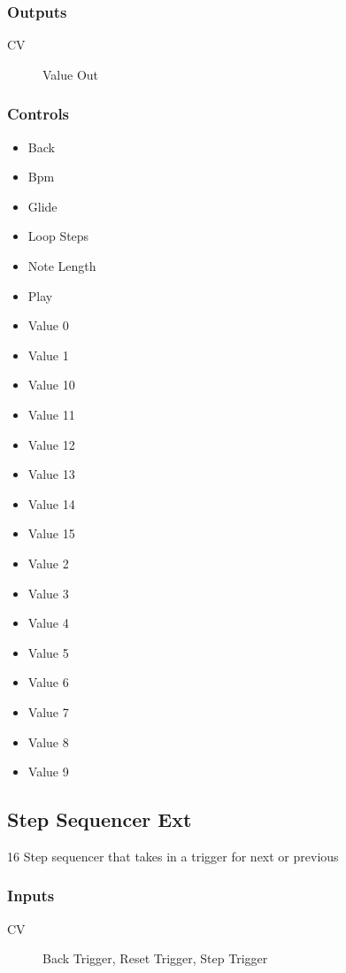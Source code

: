 \subsubsection{Outputs}
\begin{description}
\item [CV] Value Out
\end{description}

\subsubsection{Controls}
\begin{itemize}
\item Back
\item Bpm
\item Glide
\item Loop Steps
\item Note Length
\item Play
\item Value 0
\item Value 1
\item Value 10
\item Value 11
\item Value 12
\item Value 13
\item Value 14
\item Value 15
\item Value 2
\item Value 3
\item Value 4
\item Value 5
\item Value 6
\item Value 7
\item Value 8
\item Value 9
\end{itemize}

\subsection{Step Sequencer Ext}

16 Step sequencer that takes in a trigger for next or previous



\subsubsection{Inputs}
\begin{description}
\item [CV] Back Trigger, Reset Trigger, Step Trigger
\end{description}

